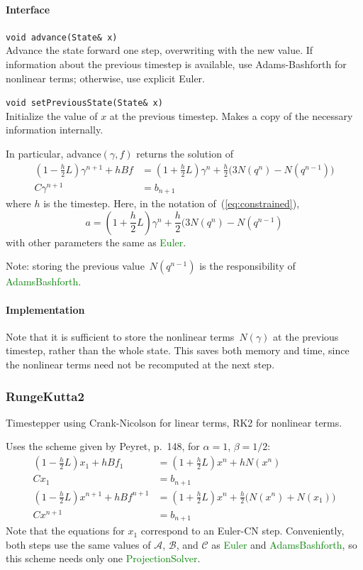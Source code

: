 \documentclass[11pt]{article}
\def\class#1{\textcolor{green}{\ttfamily\small #1}} %
\def\fn#1{{\ttfamily\small #1}} %
\let\code\lstinline
\begin{document}
\paragraph{Interface}
\begin{description}
	\item \code|void advance(State& x)|\\
		Advance the state forward one step, overwriting with the new value.  If information about the previous timestep is available, use Adams-Bashforth for nonlinear terms; otherwise, use explicit Euler.
	\item \code|void setPreviousState(State& x)|\\
		Initialize the value of $x$ at the previous timestep.  Makes a copy of the necessary information internally.
\end{description}

In particular, \fn{advance}$(\gamma,f)$ returns the solution of
	\begin{align}
		(1-\frac{h}{2}L)\gamma^{n+1} + hBf &= (1 + \frac{h}{2}L)\gamma^n + \frac{h}{2} \big(3N(q^n) - N(q^{n-1})\big)\\
		C\gamma^{n+1} &= b_{n+1}
	\end{align}
where $h$ is the timestep.  Here, in the notation of~(\ref{eq:constrained}),
\begin{equation}
	a = (1+\frac{h}{2}L)\gamma^n + \frac{h}{2}(3N(q^n) - N(q^{n-1})
\end{equation}
with other parameters the same as \class{Euler}.

Note: storing the previous value~$N(q^{n-1})$ is the responsibility of \class{AdamsBashforth}.

\paragraph{Implementation}
Note that it is sufficient to store the nonlinear terms~$N(\gamma)$ at the previous timestep, rather than the whole state. This saves both memory and time, since the nonlinear terms need not be recomputed at the next step.

\subsubsection{RungeKutta2}
Timestepper using Crank-Nicolson for linear terms, RK2 for nonlinear terms.

Uses the scheme given by Peyret, p.~148\cite{Peyret:2002}, for $\alpha=1$, $\beta=1/2$:
\begin{align}
	(1 - \frac{h}{2}L)x_1 + hBf_1 &= (1+\frac{h}{2}L)x^n + hN(x^n)\\
	Cx_1 &= b_{n+1}\\
	(1-\frac{h}{2}L)x^{n+1} + hBf^{n+1} &= (1 + \frac{h}{2}L)x^n + \frac{h}{2}\big(N(x^n) + N(x_1)\big)\\
	Cx^{n+1} &= b_{n+1}
\end{align}
Note that the equations for $x_1$ correspond to an Euler-CN step.  Conveniently, both steps use the same values of $\mathcal{A}$, $\mathcal{B}$, and $\mathcal{C}$ as \class{Euler} and \class{AdamsBashforth}, so this scheme needs only one \class{ProjectionSolver}.
\end{document}
